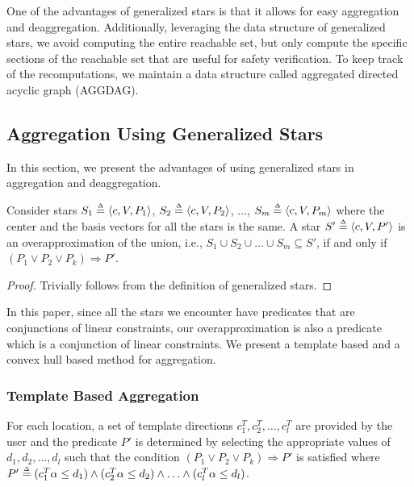 One of the advantages of generalized stars is that it allows for easy aggregation and deaggregation. 
%
Additionally, leveraging the data structure of generalized stars, we avoid computing the entire reachable set, but only compute the specific sections of the reachable set that are useful for safety verification.
%
To keep track of the recomputations, we maintain a data structure called aggregated directed acyclic graph (AGGDAG).


\subsection{Aggregation Using Generalized Stars}
\label{sec:aggStars}

In this section, we present the advantages of using generalized stars in aggregation and deaggregation. 
%

\begin{lemma}
\label{lem:agg}
Consider stars $S_1 \deq \tup{c, V, P_1}$, $S_2 \deq \tup{c, V, P_2}$, $\ldots$, $S_m \deq \tup{c, V, P_m}$ where the center and the basis vectors for all the stars is the same.
%
A star $S' \deq \tup{c, V, P'}$ is an overapproximation of the union, i.e., $S_1 \cup S_2 \cup \ldots \cup S_m \subseteq S'$, if and only if $(P_1 \vee P_2 \vee P_k) \Rightarrow P'$.
\end{lemma}
\begin{proof}
Trivially follows from the definition of generalized stars.
\end{proof}

In this paper, since all the stars we encounter have predicates that are conjunctions of linear constraints, our overapproximation is also a predicate which is a conjunction of linear constraints. We present a template based and a convex hull based method for aggregation.

\subsubsection{Template Based Aggregation}
%
%
For each location, a set of template directions $c_1^{T}, c_2^{T}, \ldots, c_{l}^{T}$ are provided by the user and the predicate $P'$ is determined by selecting the appropriate values of $d_1, d_2, \ldots, d_l$ such that the condition $(P_1 \vee P_2 \vee P_k) \Rightarrow P'$ is satisfied where $P' \mathrel{\stackrel{\scriptscriptstyle\Delta}{=}} (c_1^{T}\alpha \leq d_1) \wedge (c_2^{T}\alpha \leq d_2) \wedge \ldots \wedge (c_l^{T}\alpha \leq d_l)$. 

